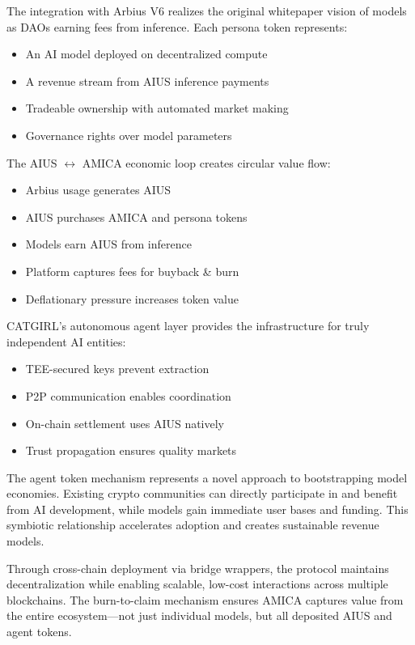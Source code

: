 \documentclass{article}
\begin{document}
The integration with Arbius V6 realizes the original whitepaper vision of models as DAOs earning fees from inference. Each persona token represents:
\begin{itemize}
    \item An AI model deployed on decentralized compute
    \item A revenue stream from AIUS inference payments
    \item Tradeable ownership with automated market making
    \item Governance rights over model parameters
\end{itemize}

The AIUS $\leftrightarrow$ AMICA economic loop creates circular value flow:
\begin{itemize}
    \item Arbius usage generates AIUS
    \item AIUS purchases AMICA and persona tokens
    \item Models earn AIUS from inference
    \item Platform captures fees for buyback \& burn
    \item Deflationary pressure increases token value
\end{itemize}

CATGIRL's autonomous agent layer provides the infrastructure for truly independent AI entities:
\begin{itemize}
    \item TEE-secured keys prevent extraction
    \item P2P communication enables coordination
    \item On-chain settlement uses AIUS natively
    \item Trust propagation ensures quality markets
\end{itemize}

The agent token mechanism represents a novel approach to bootstrapping model economies. Existing crypto communities can directly participate in and benefit from AI development, while models gain immediate user bases and funding. This symbiotic relationship accelerates adoption and creates sustainable revenue models.

Through cross-chain deployment via bridge wrappers, the protocol maintains decentralization while enabling scalable, low-cost interactions across multiple blockchains. The burn-to-claim mechanism ensures AMICA captures value from the entire ecosystem—not just individual models, but all deposited AIUS and agent tokens.
\end{document}
